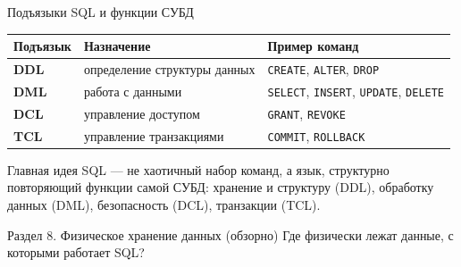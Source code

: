 \documentclass[aspectratio=169]{beamer}
\begin{document}
\begin{frame}{Подъязыки SQL и функции СУБД}

\small
\begin{table}
\centering
\begin{tabular}{>{\bfseries}p{}|p{}|p{}}
\toprule
Подъязык & Назначение & Пример команд\\
\midrule
DDL & определение структуры данных & \texttt{CREATE}, \texttt{ALTER}, \texttt{DROP}\\
DML & работа с данными & \texttt{SELECT}, \texttt{INSERT}, \texttt{UPDATE}, \texttt{DELETE}\\
DCL & управление доступом & \texttt{GRANT}, \texttt{REVOKE}\\
TCL & управление транзакциями & \texttt{COMMIT}, \texttt{ROLLBACK}\\
\bottomrule
\end{tabular}
\end{table}

\vspace{0.4cm}

\begin{alertblock}{Главная идея}
SQL — не хаотичный набор команд, а язык, структурно
повторяющий функции самой СУБД: хранение и структуру
(DDL), обработку данных (DML), безопасность (DCL),
транзакции (TCL).
\end{alertblock}

\end{frame}



\begin{frame}{Раздел 8. Физическое хранение данных (обзорно)}
\centering
\Large
Где физически лежат данные, с которыми работает SQL?
\end{frame}
\end{document}
